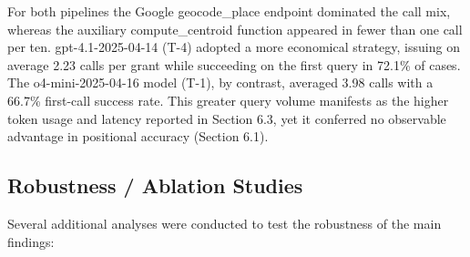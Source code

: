 For both pipelines the Google geocode\_place endpoint dominated the call
mix, whereas the auxiliary compute\_centroid function appeared in fewer
than one call per ten. gpt-4.1-2025-04-14 (T-4) adopted a more
economical strategy, issuing on average 2.23 calls per grant while
succeeding on the first query in 72.1\% of cases. The o4-mini-2025-04-16
model (T-1), by contrast, averaged 3.98 calls with a 66.7\% first-call
success rate. This greater query volume manifests as the higher token
usage and latency reported in Section 6.3, yet it conferred no
observable advantage in positional accuracy (Section 6.1).

\subsection{Robustness / Ablation
Studies}\label{robustness-ablation-studies}

Several additional analyses were conducted to test the robustness of the
main findings:

